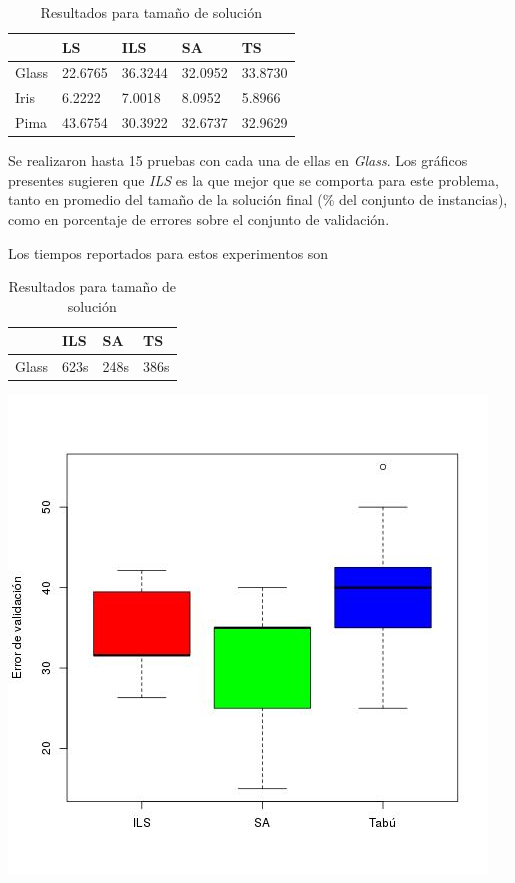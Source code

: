 \documentclass[11pt]{article}
\begin{document}
\begin{table}[h]
\begin{tabular}{ |l|l|l|l|l| }
    \hline
     & LS & ILS & SA & TS  \\ \hline
    Glass & 22.6765 & 36.3244    & 32.0952 & 33.8730 \\ \hline
    Iris  & 6.2222 & 7.0018     & 8.0952  & 5.8966 \\ \hline
    Pima  & 43.6754 & 30.3922 & 32.6737       & 32.9629 \\ \hline
\end{tabular}
\caption{Resultados para tamaño de solución}
\label{tabla:2}
\end{table}


Se realizaron 
hasta 15 pruebas con cada una de ellas en \emph{Glass}. Los gráficos 
presentes sugieren que \emph{ILS} es la que mejor que se comporta para este problema, 
tanto en promedio del tamaño de la solución final (\% del conjunto de instancias), 
como en porcentaje de errores sobre el conjunto de validación.

Los tiempos reportados para estos experimentos son

\begin{table}[h]
\begin{tabular}{ |l|l|l|l| }
    \hline
     & ILS & SA & TS  \\ \hline
    Glass & 623s & 248s & 386s \\ \hline
\end{tabular}
\caption{Resultados para tamaño de solución}
\label{tabla:2}
\end{table}


\begin{center}
  \includegraphics[scale=0.4]{val_errors.jpeg}~\\[1cm]
\end{center}
\end{document}
